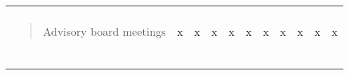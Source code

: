 \begin{longtable}[]{@{}lllllllllll@{}}
\begin{minipage}[t]{0.07\columnwidth}\raggedright \strut \end{minipage} & \begin{minipage}[t]{0.07\columnwidth}\raggedright \strut \end{minipage} & \begin{minipage}[t]{0.07\columnwidth}\raggedright \strut \end{minipage}\tabularnewline \begin{minipage}[t]{0.07\columnwidth}\raggedright \begin{quote}
Advisory board meetings \end{quote}\strut \end{minipage} & \begin{minipage}[t]{0.07\columnwidth}\raggedright x\strut \end{minipage} & \begin{minipage}[t]{0.07\columnwidth}\raggedright x\strut \end{minipage} & \begin{minipage}[t]{0.07\columnwidth}\raggedright x\strut \end{minipage} & \begin{minipage}[t]{0.07\columnwidth}\raggedright x\strut \end{minipage} & \begin{minipage}[t]{0.07\columnwidth}\raggedright x\strut \end{minipage} & \begin{minipage}[t]{0.07\columnwidth}\raggedright x\strut \end{minipage} & \begin{minipage}[t]{0.07\columnwidth}\raggedright x\strut \end{minipage} & \begin{minipage}[t]{0.07\columnwidth}\raggedright x\strut \end{minipage} & \begin{minipage}[t]{0.07\columnwidth}\raggedright x\strut \end{minipage} & \begin{minipage}[t]{0.07\columnwidth}\raggedright x\strut \end{minipage}\tabularnewline \begin{minipage}[t]{0.07\columnwidth}\raggedright \begin{quote}

\end{quote}
\end{minipage}
\end{longtable}
